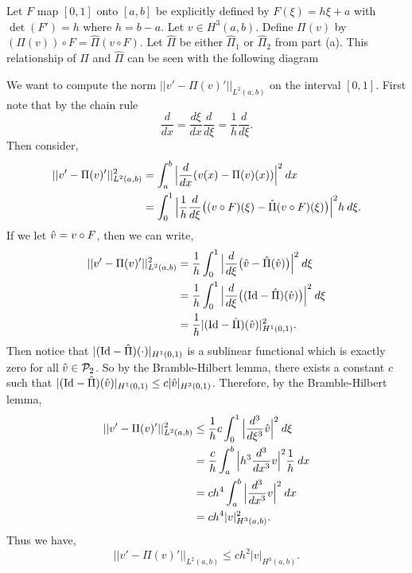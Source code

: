 \documentclass[11pt]{article}
\begin{document}
Let $F$ map $[0,1]$ onto $[a,b]$ be explicitly defined by $F(\xi) = h\xi + a$ with $\det(F') = h$ where $h=b-a$.
Let $v \in H^3(a,b)$.
Define $\Pi(v)$ by $(\Pi(v)) \circ F = \widehat{\Pi}(v \circ F)$.
Let $\widehat{\Pi}$ be either $\widehat{\Pi}_1$ or $\widehat{\Pi}_2$ from part (a).
This relationship of $\Pi$ and $\widehat{\Pi}$ can be seen with the following diagram
\begin{center}
\end{center}
We want to compute the norm $||v' - \Pi(v)'||_{L^2(a,b)}$ on the interval $[0,1]$.
First note that by the chain rule
\begin{equation*}
    \frac{d}{dx} = \frac{d\xi}{dx} \frac{d}{d\xi} = \frac{1}{h} \frac{d}{d\xi}.
\end{equation*}
Then consider,
\begin{align*}
    ||v' - \Pi(v)'||_{L^2(a,b)}^2 &= \int_a^b \Big| \frac{d}{dx}(v(x) - \Pi(v)(x) )\Big|^2 \: dx \\
    &= \int_0^1 \Big| \frac{1}{h} \frac{d}{d\xi} \big( (v\circ F)(\xi) - \Hat{\Pi}(v \circ F)(\xi) \big) \Big|^2 h \: d\xi.
\end{align*}
If we let $\Hat{v} = v \circ F$, then we can write,
\begin{align*}
    ||v' - \Pi(v)'||_{L^2(a,b)}^2 &= \frac{1}{h} \int_0^1 \Big| \frac{d}{d\xi} \big( \Hat{v} - \Hat{\Pi}(\Hat{v}) \big) \Big|^2 \: d\xi \\
    &= \frac{1}{h} \int_0^1 \Big| \frac{d}{d\xi} \big( (\text{Id} - \Hat{\Pi})(\Hat{v}) \big) \Big|^2 \: d\xi \\
    &= \frac{1}{h} |(\text{Id} - \Hat{\Pi})(\Hat{v})|^2_{H^1(0,1)}.
\end{align*}
Then notice that $|(\text{Id} - \Hat{\Pi})(\cdot)|_{H^1(0,1)}$ is a sublinear functional which is exactly zero for all $\Hat{v} \in \mathcal{P}_2$.
So by the Bramble-Hilbert lemma, there exists a constant $c$ such that $|(\text{Id} - \Hat{\Pi})(\Hat{v})|_{H^1(0,1)} \leq c |\Hat{v}|_{H^3(0,1)}$.
Therefore, by the Bramble-Hilbert lemma,
\begin{align*}
    ||v' - \Pi(v)'||_{L^2(a,b)}^2 &\leq \frac{1}{h} c \int_0^1 \Big| \frac{d^3}{d\xi^3} \Hat{v} \Big|^2 \: d\xi \\
    &= \frac{c}{h} \int_a^b \Big| h^3 \frac{d^3}{dx^3} v \Big|^2 \frac{1}{h} \: dx \\
    &= c h^4 \int_a^b \Big| \frac{d^3}{dx^3} v \Big|^2 \: dx \\
    &= c h^4 |v|^2_{H^3(a,b)}.
\end{align*}
Thus we have,
\begin{equation*}
    ||v' - \Pi(v)'||_{L^2(a,b)} \leq ch^2 |v|_{H^3(a,b)}.
\end{equation*}
\end{document}
